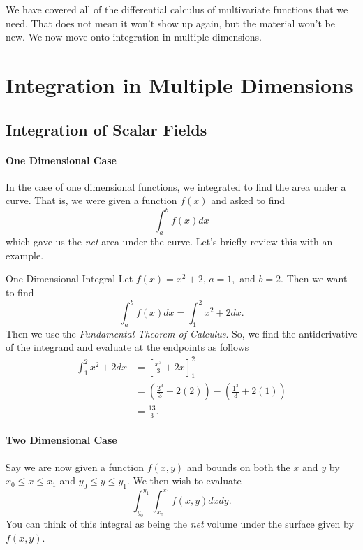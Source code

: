         
        We have covered all of the differential calculus of multivariate functions that we need.  That does not mean it won't show up again, but the material won't be new.  We now move onto integration in multiple dimensions.
        
        \chapter{Integration in Multiple Dimensions}
        
        \section{Integration of Scalar Fields}
        
        \subsubsection{One Dimensional Case}
        In the case of one dimensional functions, we integrated to find the area under a curve.  That is, we were given a function $f(x)$ and asked to find
        \[
        \int_a^b f(x)dx
        \]
        which gave us the \emph{net} area under the curve.  Let's briefly review this with an example.
        
        \begin{ex}{One-Dimensional Integral}
        Let $f(x) = x^2+2$, $a=1,$ and $b=2$. Then we want to find
        \[
        \int_a^b f(x)dx = \int_1^2 x^2+2dx.
        \]
        Then we use the \emph{Fundamental Theorem of Calculus}. So, we find the antiderivative of the integrand and evaluate at the endpoints as follows
        \begin{align*}
            \int_1^2 x^2+2dx &= \left[ \frac{x^3}{3}+2x\right]_1^2\\
            &= \left(\frac{2^3}{3}+2(2)\right) - \left( \frac{1^3}{3}+2(1)\right)\\
            &= \frac{13}{3}.
        \end{align*}
        \end{ex}
        
        \subsubsection{Two Dimensional Case}
        
        Say we are now given a function $f(x,y)$ and bounds on both the $x$ and $y$ by
        $x_0 \leq x \leq x_1$ and $y_0 \leq y \leq y_1$.  We then wish to evaluate
        \[
        \int_{y_0}^{y_1} \int_{x_0}^{x_1} f(x,y)dxdy.
        \]
        You can think of this integral as being the \emph{net} volume under the surface given by $f(x,y)$.  
        
